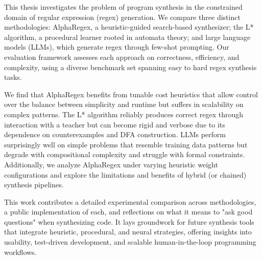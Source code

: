 
\pagestyle{plain}
\setcounter{page}{1}



\indent\indent This thesis investigates the problem of program synthesis in the constrained domain of regular expression (regex) generation. We compare three distinct methodologies: AlphaRegex, a heuristic-guided search-based synthesizer; the L* algorithm, a procedural learner rooted in automata theory; and large language models (LLMs), which generate regex through few-shot prompting. Our evaluation framework assesses each approach on correctness, efficiency, and complexity, using a diverse benchmark set spanning easy to hard regex synthesis tasks.

\indent\indent We find that AlphaRegex benefits from tunable cost heuristics that allow control over the balance between simplicity and runtime but suffers in scalability on complex patterns. The L* algorithm reliably produces correct regex through interaction with a teacher but can become rigid and verbose due to its dependence on counterexamples and DFA construction. LLMs perform surprisingly well on simple problems that resemble training data patterns but degrade with compositional complexity and struggle with formal constraints. Additionally, we analyze AlphaRegex under varying heuristic weight configurations and explore the limitations and benefits of hybrid (or chained) synthesis pipelines.

\indent\indent This work contributes a detailed experimental comparison across methodologies, a public implementation of each, and reflections on what it means to "ask good questions" when synthesizing code. It lays groundwork for future synthesis tools that integrate heuristic, procedural, and neural strategies, offering insights into usability, test-driven development, and scalable human-in-the-loop programming workflows.

\pagebreak{}
